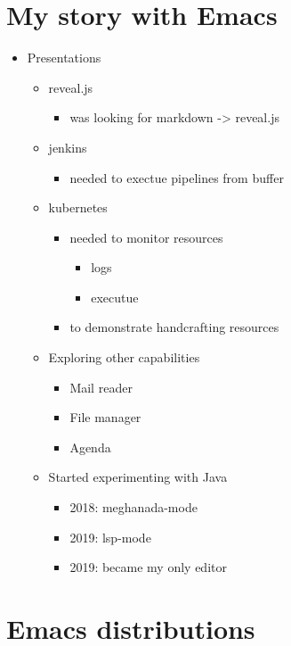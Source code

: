 \documentclass[presentation]{beamer}
\begin{document}
\section*{My story with Emacs}
\label{sec:org265ffe2}

\begin{itemize}
\item Presentations
\begin{itemize}
\item reveal.js
\begin{itemize}
\item was looking for markdown -> reveal.js
\end{itemize}
\item jenkins
\begin{itemize}
\item needed to exectue pipelines from buffer
\end{itemize}
\item kubernetes
\begin{itemize}
\item needed to monitor resources
\begin{itemize}
\item logs
\item executue
\end{itemize}
\item to demonstrate handcrafting resources
\end{itemize}

\item Exploring other capabilities
\begin{itemize}
\item Mail reader
\item File manager
\item Agenda
\end{itemize}

\item Started experimenting with Java
\begin{itemize}
\item 2018: meghanada-mode
\item 2019: lsp-mode
\item 2019: became my only editor
\end{itemize}
\end{itemize}
\end{itemize}

\section*{Emacs distributions}
\label{sec:orgdb26274}
\end{document}
